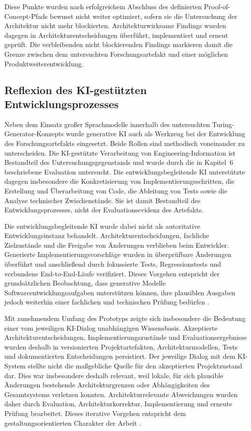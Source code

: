 Diese Punkte wurden nach erfolgreichem Abschluss des definierten
Proof-of-Concept-Pfads bewusst nicht weiter optimiert, sofern sie die
Untersuchung der Architektur nicht mehr blockierten. Architekturwirksame
Findings wurden dagegen in Architekturentscheidungen überführt, implementiert
und erneut geprüft. Die verbleibenden nicht blockierenden Findings markieren
damit die Grenze zwischen dem untersuchten Forschungsartefakt und einer
möglichen Produktweiterentwicklung.

\subsection{Reflexion des KI-gestützten Entwicklungsprozesses}
\label{sec:discussion_ai_assisted_development}

Neben dem Einsatz großer Sprachmodelle innerhalb des untersuchten
Turing-Generator-Konzepts wurde generative KI auch als Werkzeug bei der
Entwicklung des Forschungsartefakts eingesetzt. Beide Rollen sind methodisch
voneinander zu unterscheiden. Die KI-gestützte Verarbeitung von
Engineering-Information ist Bestandteil des Untersuchungsgegenstands und
wurde durch die in Kapitel~6 beschriebene Evaluation untersucht. Die
entwicklungsbegleitende KI unterstützte dagegen insbesondere die
Konkretisierung von Implementierungsschritten, die Erstellung und
Überarbeitung von Code, die Ableitung von Tests sowie die Analyse technischer
Zwischenstände. Sie ist damit Bestandteil des Entwicklungsprozesses, nicht der
Evaluationsevidenz des Artefakts.

Die entwicklungsbegleitende KI wurde dabei nicht als autoritative
Entwicklungsinstanz behandelt. Architekturentscheidungen, fachliche
Zielzustände und die Freigabe von Änderungen verblieben beim Entwickler.
Generierte Implementierungsvorschläge wurden in überprüfbare Änderungen
überführt und anschließend durch fokussierte Tests, Regressionstests und
verbundene End-to-End-Läufe verifiziert. Dieses Vorgehen entspricht der
grundsätzlichen Beobachtung, dass generative Modelle
Softwareentwicklungsaufgaben unterstützen können, ihre plausiblen Ausgaben
jedoch weiterhin einer fachlichen und technischen Prüfung bedürfen
\cite{Barke2023}.

Mit zunehmendem Umfang des Prototyps zeigte sich insbesondere die Bedeutung
einer vom jeweiligen KI-Dialog unabhängigen Wissensbasis. Akzeptierte
Architekturentscheidungen, Implementierungszustände und
Evaluationsergebnisse wurden deshalb in versionierten Projektartefakten,
Architekturmodellen, Tests und dokumentierten Entscheidungen persistiert.
Der jeweilige Dialog mit dem KI-System stellte nicht die maßgebliche Quelle
für den akzeptierten Projektzustand dar. Dies war insbesondere deshalb
relevant, weil lokale, für sich plausible Änderungen bestehende
Architekturgrenzen oder Abhängigkeiten des Gesamtsystems verletzen konnten.
Architekturrelevante Abweichungen wurden daher durch Evaluation,
Architekturkorrektur, Implementierung und erneute Prüfung bearbeitet. Dieses
iterative Vorgehen entspricht dem gestaltungsorientierten Charakter der
Arbeit \cite{Wieringa2014}.

